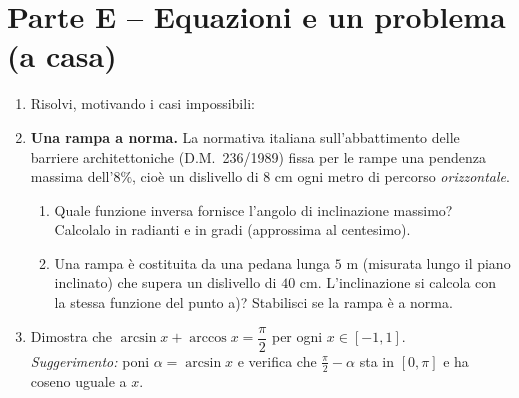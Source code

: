 \documentclass[11pt,a4paper]{article}
\begin{document}
\section*{Parte E -- Equazioni e un problema (a casa)}
\begin{enumerate}[label=\textbf{E.\arabic*}]
\item Risolvi, motivando i casi impossibili:

\item \textbf{Una rampa a norma.} La normativa italiana sull'abbattimento delle barriere architettoniche (D.M.~236/1989) fissa per le rampe una pendenza massima dell'$8\%$, cio\`e un dislivello di $8$ cm ogni metro di percorso \emph{orizzontale}.
\begin{enumerate}[label=\alph*), itemsep=2pt]
\item Quale funzione inversa fornisce l'angolo di inclinazione massimo? Calcolalo in radianti e in gradi (approssima al centesimo).
\item Una rampa \`e costituita da una pedana lunga $5$ m (misurata lungo il piano inclinato) che supera un dislivello di $40$ cm. L'inclinazione si calcola con la stessa funzione del punto a)? Stabilisci se la rampa \`e a norma.
\end{enumerate}

\item[$\ast$\textbf{E.3}] Dimostra che $\arcsin x+\arccos x=\dfrac{\pi}{2}$ per ogni $x\in[-1,1]$.\\
\emph{Suggerimento:} poni $\alpha=\arcsin x$ e verifica che $\frac{\pi}{2}-\alpha$ sta in $[0,\pi]$ e ha coseno uguale a $x$.
\end{enumerate}
\end{document}
